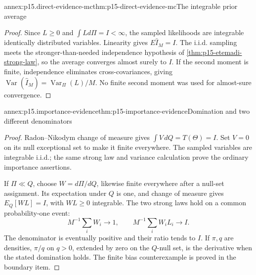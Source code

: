 \begin{annexitem}{annex:p15.direct-evidence-mc}{thm:p15-direct-evidence-mc}{The integrable prior average}
\begin{proof}
Since \(L\geq0\) and \(\int Ld\Pi=I<\infty\), the sampled likelihoods
are integrable identically distributed variables. Linearity gives
\(E\widehat I_M=I\). The i.i.d. sampling meets the stronger-than-needed
independence hypothesis of \cref{thm:p15-etemadi-strong-law}, so the
average converges almost surely to \(I\). If the second moment is finite,
independence eliminates cross-covariances, giving
\(\operatorname{Var}(\widehat I_M)=\operatorname{Var}_\Pi(L)/M\).
No finite second moment was used for almost-sure convergence.
\end{proof}
\end{annexitem}

\begin{annexitem}{annex:p15.importance-evidence}{thm:p15-importance-evidence}{Domination and two different denominators}
\begin{proof}
Radon--Nikodym change of measure gives
\(\int V\,dQ=T(\Theta)=I\). Set \(V=0\) on its null exceptional set
to make it finite everywhere. The sampled variables are integrable
i.i.d.; the same strong law and variance calculation prove the ordinary
importance assertions.

If \(\Pi\ll Q\), choose \(W=d\Pi/dQ\), likewise finite everywhere
after a null-set assignment. Its expectation under \(Q\) is one, and
change of measure gives \(E_Q[WL]=I\), with \(WL\geq0\) integrable.
The two strong laws hold on a common probability-one event:
\[
 M^{-1}\sum_iW_i\to1,\qquad M^{-1}\sum_iW_iL_i\to I.
\]
The denominator is eventually positive and their ratio tends to \(I\).
If \(\pi,q\) are densities, \(\pi/q\) on \(q>0\), extended by zero
on the \(Q\)-null set, is the derivative when the stated domination
holds. The finite bias counterexample is proved in the boundary item.
\end{proof}
\end{annexitem}

